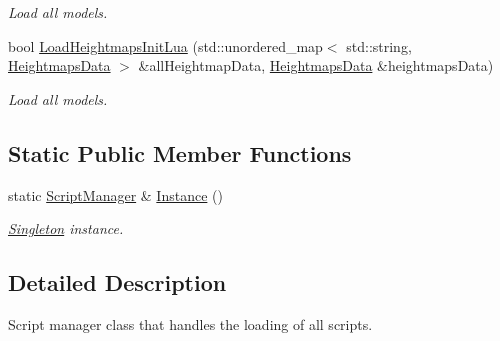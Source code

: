 \begin{CompactItemize}
\begin{CompactList}\small\item\em Load all models. \item\end{CompactList}\item 
bool \hyperlink{class_script_manager_3d83ba0f6648aad0eb0bca48665e93d4}{LoadHeightmapsInitLua} (std::unordered\_\-map$<$ std::string, \hyperlink{struct_heightmaps_data}{HeightmapsData} $>$ \&allHeightmapData, \hyperlink{struct_heightmaps_data}{HeightmapsData} \&heightmapsData)
\begin{CompactList}\small\item\em Load all models. \item\end{CompactList}\end{CompactItemize}
\subsection*{Static Public Member Functions}
\begin{CompactItemize}
\item 
static \hyperlink{class_script_manager}{ScriptManager} \& \hyperlink{class_script_manager_2d9fe01b9c07cdc83d2da4168f4f6cc5}{Instance} ()
\begin{CompactList}\small\item\em \hyperlink{class_singleton}{Singleton} instance. \item\end{CompactList}\end{CompactItemize}


\subsection{Detailed Description}
Script manager class that handles the loading of all scripts. 

